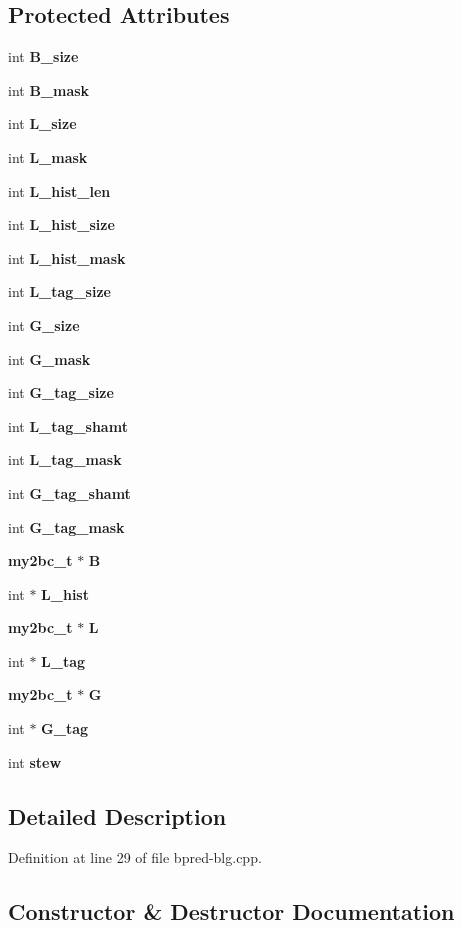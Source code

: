 \subsection*{Protected Attributes}
\begin{CompactItemize}
\item 
int {\bf B\_\-size}
\item 
int {\bf B\_\-mask}
\item 
int {\bf L\_\-size}
\item 
int {\bf L\_\-mask}
\item 
int {\bf L\_\-hist\_\-len}
\item 
int {\bf L\_\-hist\_\-size}
\item 
int {\bf L\_\-hist\_\-mask}
\item 
int {\bf L\_\-tag\_\-size}
\item 
int {\bf G\_\-size}
\item 
int {\bf G\_\-mask}
\item 
int {\bf G\_\-tag\_\-size}
\item 
int {\bf L\_\-tag\_\-shamt}
\item 
int {\bf L\_\-tag\_\-mask}
\item 
int {\bf G\_\-tag\_\-shamt}
\item 
int {\bf G\_\-tag\_\-mask}
\item 
{\bf my2bc\_\-t} $\ast$ {\bf B}
\item 
int $\ast$ {\bf L\_\-hist}
\item 
{\bf my2bc\_\-t} $\ast$ {\bf L}
\item 
int $\ast$ {\bf L\_\-tag}
\item 
{\bf my2bc\_\-t} $\ast$ {\bf G}
\item 
int $\ast$ {\bf G\_\-tag}
\item 
int {\bf stew}
\end{CompactItemize}


\subsection{Detailed Description}


Definition at line 29 of file bpred-blg.cpp.

\subsection{Constructor \& Destructor Documentation}

